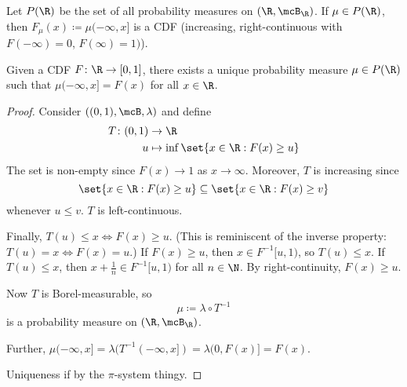 
Let $P(\R)$ be the set of all probability measures on $(\R, \mcB_\R)$.
If $\mu \in P(\R)$, then $F_\mu(x) \coloneq \mu (-\infty, x]$ is a CDF
(increasing, right-continuous with $F(-\infty) = 0$, $F(\infty) = 1)$).

\begin{theorem*}
    Given a CDF $F\colon \R \to [0, 1]$, there exists a unique
    probability measure $\mu \in P(\R)$ such that
    $\mu(-\infty, x] = F(x)$ for all $x \in \R$.
\end{theorem*}

\begin{proof}
    Consider $((0, 1), \mcB, \lambda)$ and define \begin{align*}
        T\colon (0, 1) &\to \R \\
        u &\mapsto \inf\set{x \in \R : F(x) \ge u}
    \end{align*}
    The set is non-empty since $F(x) \to 1$ as $x \to \infty$.
    Moreover, $T$ is increasing since \[
        \set{x \in \R : F(x) \ge u} \subseteq \set{x \in \R : F(x) \ge v}
    \] whenever $u \le v$.
    $T$ is left-continuous.

    Finally, $T(u) \le x \iff F(x) \ge u$.
    (This is reminiscent of the inverse property: $T(u) = x \iff F(x) = u$.)
    If $F(x) \ge u$, then $x \in F^{-1}[u, 1)$, so $T(u) \le x$.
    If $T(u) \le x$, then $x + \frac1n \in F^{-1}[u, 1)$ for all $n \in \N$.
    By right-continuity, $F(x) \ge u$.

    Now $T$ is Borel-measurable, so \[
        \mu \coloneq \lambda \circ T^{-1} %
    \] is a probability measure on $(\R, \mcB_\R)$.

    Further, $\mu(-\infty, x] = \lambda(T^{-1}(-\infty, x])
    = \lambda(0, F(x)] = F(x)$.

    Uniqueness if by the $\pi$-system thingy. %
\end{proof}

